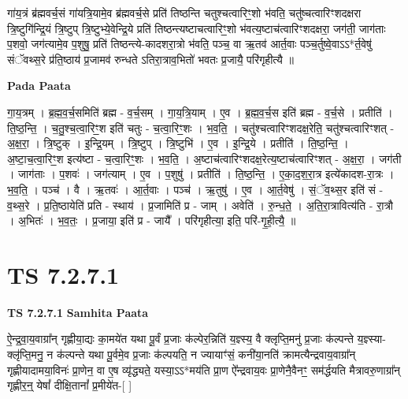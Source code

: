 \documentclass[17pt]{extarticle}
\begin{document}
गा॑य॒त्रं ब्र॑ह्मवर्च॒सं गा॑यत्रि॒यामे॒व ब्र॑ह्मवर्च॒से प्रति॑ तिष्ठन्ति चतुश्चत्वारिꣳ॒॒शो भ॑वति॒ चतु॑ष्चत्वारिꣳशदक्षरा त्रि॒ष्टुगि॑न्द्रि॒यं त्रि॒ष्टुप् त्रि॒ष्टुभ्ये॒वेन्द्रि॒ये प्रति॑ तिष्ठन्त्यष्टाचत्वारिꣳ॒॒शो भ॑वत्य॒ष्टाच॑त्वारिꣳशदक्षरा॒ जग॑ती॒ जाग॑ताः प॒शवो॒ जग॑त्यामे॒व प॒शुषु॒ प्रति॑ तिष्ठन्त्ये-कादशरा॒त्रो भ॑वति॒ पञ्च॒ वा ऋ॒तव॑ आर्त॒वाः पञ्च॒र्तुष्वे॒वाऽऽ*र्त॒वेषु॑ संॅवथ्स॒रे प्र॑ति॒ष्ठाय॑ प्र॒जामव॑ रुन्धते ऽतिरा॒त्राव॒भितो॑ भवतः प्र॒जायै॒ परि॑गृहीत्यै ॥ \newline

\textbf{Pada Paata} \newline

गा॒य॒त्रम् । ब्र॒ह्म॒व॒र्च॒समिति॑ ब्रह्म - व॒र्च॒सम् । गा॒य॒त्रि॒याम् । ए॒व । ब्र॒ह्म॒व॒र्च॒स इति॑ ब्रह्म - व॒र्च॒से । प्रतीति॑ । ति॒ष्ठ॒न्ति॒ । च॒तु॒श्च॒त्वा॒रिꣳ॒॒श इति॑ चतुः - च॒त्वा॒रिꣳ॒॒शः । भ॒व॒ति॒ । चतु॑श्चत्वारिꣳशदक्ष॒रेति॒ चतु॑श्चत्वारिꣳशत् - अ॒क्ष॒रा॒ । त्रि॒ष्टुक् । इ॒न्द्रि॒यम् । त्रि॒ष्टुप् । त्रि॒ष्टुभि॑ । ए॒व । इ॒न्द्रि॒ये । प्रतीति॑ । ति॒ष्ठ॒न्ति॒ । अ॒ष्टा॒च॒त्वा॒रिꣳ॒॒श इत्य॑ष्टा - च॒त्वा॒रिꣳ॒॒शः । भ॒व॒ति॒ । अ॒ष्टाच॑त्वारिꣳशदक्ष॒रेत्य॒ष्टाच॑त्वारिꣳशत् - अ॒क्ष॒रा॒ । जग॑ती । जाग॑ताः । प॒शवः॑ । जग॑त्याम् । ए॒व । प॒शुषु॑ । प्रतीति॑ । ति॒ष्ठ॒न्ति॒ । ए॒का॒द॒श॒रा॒त्र इत्ये॑कादश-रा॒त्रः । भ॒व॒ति॒ । पञ्च॑ । वै । ऋ॒तवः॑ । आ॒र्त॒वाः । पञ्च॑ । ऋ॒तुषु॑ । ए॒व । आ॒र्त॒वेषु॑ । सं॒ॅव॒थ्स॒र इति॑ सं - व॒थ्स॒रे । प्र॒ति॒ष्ठायेति॑ प्रति - स्थाय॑ । प्र॒जामिति॑ प्र - जाम् । अवेति॑ । रु॒न्ध॒ते॒ । अ॒ति॒रा॒त्रावित्य॑ति - रा॒त्रौ । अ॒भितः॑ । भ॒व॒तः॒ । प्र॒जाया॒ इति॑ प्र - जायै᳚ । परि॑गृहीत्या॒ इति॒ परि॑-गृ॒ही॒त्यै॒ ॥  \newline





\section{ TS 7.2.7.1 }

\textbf{TS 7.2.7.1 } \newline
\textbf{Samhita Paata} \newline

ऐ॒न्द्र॒वा॒य॒वाग्रा᳚न् गृह्णीया॒द्यः का॒मये॑त यथा पू॒र्वं प्र॒जाः क॑ल्पेर॒न्निति॑ य॒ज्ञ्स्य॒ वै क्लृप्ति॒मनु॑ प्र॒जाः क॑ल्पन्ते य॒ज्ञ्स्या-क्लृ॑प्ति॒मनु॒ न क॑ल्पन्ते यथा पू॒र्वमे॒व प्र॒जाः क॑ल्पयति॒ न ज्यायाꣳ॑सं॒ कनी॑या॒नति॑ क्रामत्यैन्द्रवाय॒वाग्रा᳚न् गृह्णीयादामया॒विनः॑ प्रा॒णेन॒ वा ए॒ष व्यृ॑द्ध्यते॒ यस्या॒ऽऽ*मय॑ति प्रा॒ण ऐ᳚न्द्रवाय॒वः प्रा॒णेनै॒वैनꣳ॒॒ सम॑र्द्धयति मैत्रावरु॒णाग्रा᳚न् गृह्णीर॒न्॒ येषां᳚ दीक्षि॒तानां᳚ प्र॒मीये॑त-[  ] \newline
\end{document}

